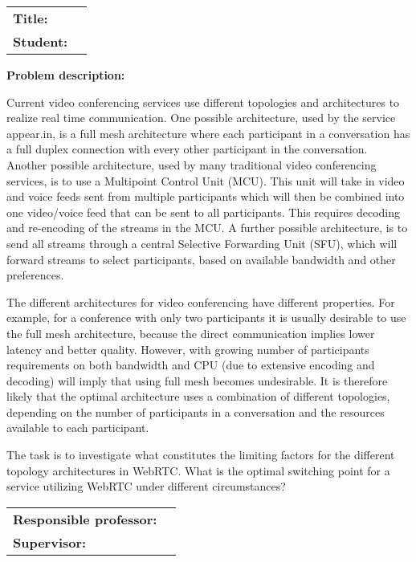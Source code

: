 \begin{titlingpage}

\noindent
\begin{tabular}{@{}p{4cm}l}
\textbf{Title:} 	& \thetitle \\
\textbf{Student:}	& \theauthor \\
\end{tabular}

\vspace{4ex}
\noindent\textbf{Problem description:}
\vspace{2ex}

Current video conferencing services use different topologies and architectures to realize real time communication. One possible architecture, used by the service appear.in, is a full mesh architecture where each participant in a conversation has a full duplex connection with every other participant in the conversation. Another possible architecture, used by many traditional video conferencing services, is to use a Multipoint Control Unit (MCU). This unit will take in video and voice feeds sent from multiple participants which will then be combined into one video/voice feed that can be sent to all participants. This requires decoding and re-encoding of the streams in the MCU. A further possible architecture, is to send all streams through a central Selective Forwarding Unit (SFU), which will forward streams to select participants, based on available bandwidth and other preferences.

The different architectures for video conferencing have different properties. For example, for a conference with only two participants it is usually desirable to use the full mesh architecture, because the direct communication implies lower latency and better quality. However, with growing number of participants requirements on both bandwidth and CPU (due to extensive encoding and decoding) will imply that using full mesh becomes undesirable.  It is therefore likely that the optimal architecture uses a combination of different topologies, depending on the number of participants in a conversation and the resources available to each participant.

The task is to investigate what constitutes the limiting factors for the different topology architectures in WebRTC. What is the optimal switching point for a service utilizing WebRTC under different circumstances?

\vspace{6ex}

\noindent
\begin{tabular}{@{}p{4cm}l}
\textbf{Responsible professor:} 	& \theprofessor \\
\textbf{Supervisor:}			& \thesupervisor \\
\end{tabular}

\end{titlingpage}
